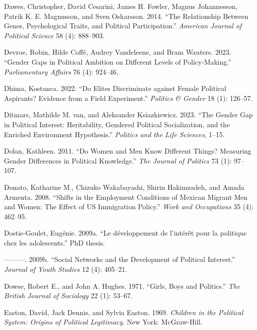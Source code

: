 \documentclass[
  letterpaper,
  DIV=11,
  numbers=noendperiod]{scrreprt}
\newlength{\cslhangindent}
\newenvironment{CSLReferences}[2] %
 {\begin{list}{}{%
  \setlength{\itemindent}{0pt}
  \setlength{\leftmargin}{0pt}
  \setlength{\parsep}{0pt}
  \ifodd #1
   \setlength{\leftmargin}{\cslhangindent}
   \setlength{\itemindent}{-1\cslhangindent}
  \fi
  \setlength{\itemsep}{#2\baselineskip}}}
 {\end{list}}
\begin{document}
\begin{CSLReferences}{1}{0}
Dawes, Christopher, David Cesarini, James H. Fowler, Magnus Johannesson,
Patrik K. E. Magnusson, and Sven Oskarsson. 2014. {``{The Relationship
Between Genes, Psychological Traits, and Political Participation}.''}
\emph{American Journal of Political Science} 58 (4): 888--903.

Devroe, Robin, Hilde Coffé, Audrey Vandeleene, and Bram Wauters. 2023.
{``{Gender Gaps in Political Ambition on Different Levels of
Policy-Making}.''} \emph{Parliamentary Affairs} 76 (4): 924--46.

Dhima, Kostanca. 2022. {``{Do Elites Discriminate against Female
Political Aspirants? Evidence from a Field Experiment}.''}
\emph{Politics \& Gender} 18 (1): 126--57.

Ditmars, Mathilde M. van, and Aleksander Ksiazkiewicz. 2023. {``{The
Gender Gap in Political Interest: Heritability, Gendered Political
Socialization, and the Enriched Environment Hypothesis}.''}
\emph{Politics and the Life Sciences}, 1--15.

Dolan, Kathleen. 2011. {``{Do Women and Men Know Different Things?
Measuring Gender Differences in Political Knowledge}.''} \emph{The
Journal of Politics} 73 (1): 97--107.

Donato, Katharine M., Chizuko Wakabayashi, Shirin Hakimzadeh, and Amada
Armenta. 2008. {``{Shifts in the Employment Conditions of Mexican
Migrant Men and Women: The Effect of US Immigration Policy}.''}
\emph{Work and Occupations} 35 (4): 462--95.

Dostie-Goulet, Eugénie. 2009a. {``{Le d{é}veloppement de l'int{é}r{ê}t
pour la politique chez les adolescents}.''} PhD thesis.

---------. 2009b. {``{Social Networks and the Development of Political
Interest}.''} \emph{Journal of Youth Studies} 12 (4): 405--21.

Dowse, Robert E., and John A. Hughes. 1971. {``{Girls, Boys and
Politics}.''} \emph{The British Journal of Sociology} 22 (1): 53--67.

Easton, David, Jack Dennis, and Sylvia Easton. 1969. \emph{{Children in
the Political System: Origins of Political Legitimacy}}. New York:
McGraw-Hill.


\end{CSLReferences}
\end{document}
